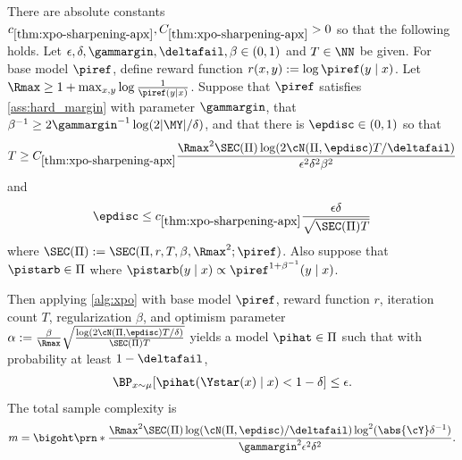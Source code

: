   \begin{theorem}
    \label{thm:xpo-sharpening-apx}
There are absolute constants $c_{\mathrm{\ref{thm:xpo-sharpening-apx}}},
C_{\mathrm{\ref{thm:xpo-sharpening-apx}}}>0$ so that the following
holds. Let $\epsilon,\delta,\gammargin,\deltafail,\beta \in (0,1)$ and
$T \in \NN$ be given. For base model $\piref$, define reward function $r(x,y) := \log \piref(y\mid x)$. Let $\Rmax \geq 1+\max_{x,y}\log\frac{1}{\piref(y\mid x)}$. Suppose that $\piref$ satisfies \cref{ass:hard_margin} with parameter $\gammargin$, that $\beta^{-1} \geq 2\gammargin^{-1}\log(2|\MY|/\delta)$, and that there is $\epdisc \in (0,1)$ so that 
\[T \geq C_{\mathrm{\ref{thm:xpo-sharpening-apx}}} \frac{\Rmax^2 \SEC(\Pi) \log(2\cN(\Pi,\epdisc)T/\deltafail)}{\epsilon^2\delta^2 \beta^2}\]
and 
\[\epdisc \leq c_{\mathrm{\ref{thm:xpo-sharpening-apx}}} \frac{\epsilon\delta}{\sqrt{\SEC(\Pi) T}}\]
where $\SEC(\Pi) := \SEC(\Pi,r,T,\beta,\Rmax^2;\piref)$. Also suppose that $\pistarb \in \Pi$ where $\pistarb(y\mid x) \propto \piref^{1+\beta^{-1}} (y\mid x)$.

Then applying \cref{alg:xpo} with base model $\piref$, reward function $r$, iteration count $T$, regularization $\beta$, and optimism parameter $\alpha := \frac{\beta}{\Rmax} \sqrt{\frac{\log(2\cN(\Pi,\epdisc)T/\delta)}{\SEC(\Pi) T}}$ yields a model $\pihat \in \Pi$ such that with probability at least $1-\deltafail$,
\[\BP_{x \sim \mu}[\pihat(\Ystar(x)\mid x) < 1-\delta] \leq
  \epsilon.\]
The total sample complexity is
\[
  m = \bigoht\prn*{
    \frac{\Rmax^2 \SEC(\Pi) \log(\cN(\Pi,\epdisc)/\deltafail)\log^2(\abs{\cY}\delta^{-1})}{ \gammargin^2\epsilon^2\delta^2}
    }.
  \]
  \end{theorem}

